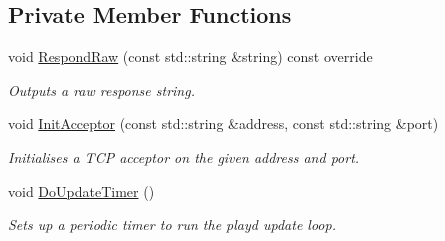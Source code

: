\subsection*{Private Member Functions}
\begin{DoxyCompactItemize}
\item 
void \hyperlink{classIoReactor_a4cfe12db93bda3f7b2c29436c4969006}{Respond\+Raw} (const std\+::string \&string) const override
\begin{DoxyCompactList}\small\item\em Outputs a raw response string. \end{DoxyCompactList}\item 
void \hyperlink{classIoReactor_aab8269bf4512c4c74a56998898b3144e}{Init\+Acceptor} (const std\+::string \&address, const std\+::string \&port)
\begin{DoxyCompactList}\small\item\em Initialises a T\+C\+P acceptor on the given address and port. \end{DoxyCompactList}\item 
\hypertarget{classIoReactor_a8a586b8e9545e79db8dc9bca3657388f}{void \hyperlink{classIoReactor_a8a586b8e9545e79db8dc9bca3657388f}{Do\+Update\+Timer} ()}\label{classIoReactor_a8a586b8e9545e79db8dc9bca3657388f}

\begin{DoxyCompactList}\small\item\em Sets up a periodic timer to run the playd update loop. \end{DoxyCompactList}\end{DoxyCompactItemize}
